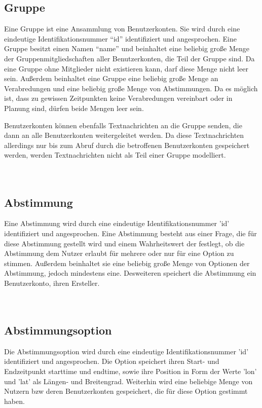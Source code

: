 \documentclass[parskip=full,11pt]{scrartcl}
\begin{document}
\subsection{Gruppe}
Eine Gruppe ist eine Ansammlung von Benutzerkonten.
Sie wird durch eine eindeutige Identifikationsnummer \enquote{id} identifiziert
und angesprochen.
Eine Gruppe besitzt einen Namen \enquote{name} und beinhaltet eine beliebig
große Menge der Gruppenmitgliedschaften aller Benutzerkonten, die Teil der
Gruppe sind.
Da eine Gruppe ohne Mitglieder nicht existieren kann, darf diese Menge nicht
leer sein. Außerdem beinhaltet eine Gruppe eine beliebig große Menge an
Verabredungen und eine beliebig große Menge von Abstimmungen.
Da es möglich ist, dass zu gewissen Zeitpunkten keine Verabredungen vereinbart
oder in Planung sind, dürfen beide Mengen leer sein.
\par Benutzerkonten können ebenfalls Textnachrichten an die Gruppe senden, die dann
an alle Benutzerkonten weitergeleitet werden.
Da diese Textnachrichten allerdings nur bis zum Abruf durch die betroffenen
Benutzerkonten gespeichert werden, werden Textnachrichten nicht als Teil einer
Gruppe modelliert.
\\
\\
\\

\pagebreak


\subsection{Abstimmung}
Eine Abstimmung wird durch eine eindeutige Identifikationsnummer 'id'
identifiziert und angesprochen.
Eine Abstimmung besteht aus einer Frage, die für diese Abstimmung gestellt wird
und einem Wahrheitswert der festlegt,
ob die Abstimmung dem Nutzer erlaubt für mehrere oder nur für eine Option zu
stimmen.
Außerdem beinhaltet sie eine beliebig große Menge von Optionen der Abstimmung,
jedoch mindestens eine.
Desweiteren speichert die Abstimmung ein Benutzerkonto, ihren Ersteller.
\\
\\
\\

\pagebreak


\subsection{Abstimmungsoption}
Die Abstimmungsoption wird durch eine eindeutige Identifikationsnummer 'id'
identifiziert und angesprochen.
Die Option speichert ihren Start- und Endzeitpunkt starttime und endtime,
sowie ihre Position in Form der Werte 'lon' und 'lat' als Längen- und
Breitengrad.
Weiterhin wird eine beliebige Menge von Nutzern bzw deren Benutzerkonten
gespeichert, die für diese Option gestimmt haben.
\\
\\
\\
\end{document}
